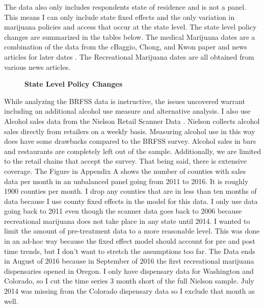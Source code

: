 \documentclass[11pt]{article}
\begin{document}
  The data also only includes respondents state of residence and is not a panel. This means I can only include state fixed effects and the only variation in marijuana policies and access that occur at the state level. The state level policy changes are summarized in the tables below. The medical Marijuana dates are a combination of the data from the cBaggio, Chong, and Kwon paper and news articles for later dates \cite{baggio_chong_kwon_2018}. The Recreational Marijuana dates are all obtained from various news articles.  \par

\begin{figure}[H]
	\centering
	\Large{\textbf{State Level Policy Changes}}\par\medskip
	\scalebox{.6}{
		
	}
	\scalebox{.6}{
		
	}
\end{figure}

While analyzing the BRFSS data is instructive, the issues uncovered warrant including an additional alcohol use measure and alternative analysis.  I also use Alcohol sales data from the Nielson Retail Scanner Data . Nielson collects alcohol sales directly from retailers on a weekly basis. Measuring alcohol use in this way does have some drawbacks compared to the BRFSS survey. Alcohol sales in bars and restaurants are completely left out of the sample. Additionally, we are limited to the retail chains that accept the survey. That being said, there is extensive coverage. The Figure in Appendix A shows the number of counties with sales data per month in an unbalanced panel going from 2011 to 2016. It is roughly 1900 counties per month. I drop any counties that are in less than ten months of data because I use county fixed effects in the model for this data. I only use data going back to 2011 even though the scanner data goes back to 2006 because recreational marijuana does not take place in any state until 2014. I wanted to limit the amount of pre-treatment data to a more reasonable level. This was done in an ad-hoc way because the fixed effect model should account for pre and post time trends, but I don't want to stretch the assumptions too far. The Data ends in August of 2016 because in September of 2016 the first recreational marijuana dispensaries opened in Oregon. I only have dispensary data for Washington and Colorado, so I cut the time series 3 month short of the full Nielson sample. July 2014 was missing from the Colorado dispensary data so I exclude that month as well. \par
\end{document}
